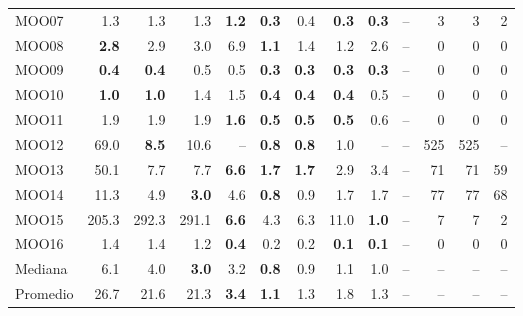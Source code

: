 \begin{table}[!htbp]
\begin{tabular}{l rrrr | rrrr | rrrr}
MOO07 & 1.3 & 1.3 & 1.3 & \textbf{1.2} & \textbf{0.3} & 0.4 & \textbf{0.3} & \textbf{0.3} & -- & 3 & 3 & 2 \\
MOO08 & \textbf{2.8} & 2.9 & 3.0 & 6.9 & \textbf{1.1} & 1.4 & 1.2 & 2.6 & -- & 0 & 0 & 0 \\
MOO09 & \textbf{0.4} & \textbf{0.4} & 0.5 & 0.5 & \textbf{0.3} & \textbf{0.3} & \textbf{0.3} & \textbf{0.3} & -- & 0 & 0 & 0 \\
MOO10 & \textbf{1.0} & \textbf{1.0} & 1.4 & 1.5 & \textbf{0.4} & \textbf{0.4} & \textbf{0.4} & 0.5 & -- & 0 & 0 & 0 \\
MOO11 & 1.9 & 1.9 & 1.9 & \textbf{1.6} & \textbf{0.5} & \textbf{0.5} & \textbf{0.5} & 0.6 & -- & 0 & 0 & 0 \\
MOO12 & 69.0 & \textbf{8.5} & 10.6 & -- & \textbf{0.8} & \textbf{0.8} & 1.0 & -- & -- & 525 & 525 & -- \\
MOO13 & 50.1 & 7.7 & 7.7 & \textbf{6.6} & \textbf{1.7} & \textbf{1.7} & 2.9 & 3.4 & -- & 71 & 71 & 59 \\
MOO14 & 11.3 & 4.9 & \textbf{3.0} & 4.6 & \textbf{0.8} & 0.9 & 1.7 & 1.7 & -- & 77 & 77 & 68 \\
MOO15 & 205.3 & 292.3 & 291.1 & \textbf{6.6} & 4.3 & 6.3 & 11.0 & \textbf{1.0} & -- & 7 & 7 & 2 \\
MOO16 & 1.4 & 1.4 & 1.2 & \textbf{0.4} & 0.2 & 0.2 & \textbf{0.1} & \textbf{0.1} & -- & 0 & 0 & 0 \\
\midrule
Mediana & 6.1 & 4.0 & \textbf{3.0} & 3.2 & \textbf{0.8} & 0.9 & 1.1 & 1.0 & -- & -- & -- & -- \\
Promedio & 26.7 & 21.6 & 21.3 & \textbf{3.4} & \textbf{1.1} & 1.3 & 1.8 & 1.3 & -- & -- & -- & -- \\
\bottomrule
\end{tabular}
\end{table}

